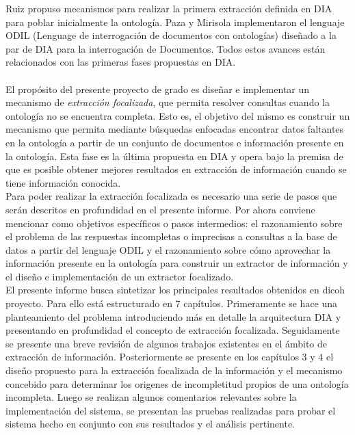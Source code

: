 Ruiz \cite{SemistructuredTextExtraction} \cite{ruiz-HMM} propuso mecanismos para realizar la primera extracción definida en DIA para poblar inicialmente la ontología. Paza y Mirisola \cite{ODILImplementation} implementaron el lenguaje ODIL (Lenguage de interrogación de documentos con ontologías) diseñado a la par de DIA para la interrogación de Documentos. Todos estos avances están relacionados con las primeras fases propuestas en DIA.  \\

\\


El propósito del presente proyecto de grado es diseñar e implementar un mecanismo de \emph{extracción focalizada}, que permita resolver consultas cuando la ontología no se encuentra completa. Esto es, el objetivo del mismo es construir un mecanismo que permita mediante búsquedas enfocadas encontrar datos faltantes en la ontología a partir de un conjunto de documentos e información presente en la ontología. Esta fase es la última propuesta en DIA y opera bajo la premisa de que es posible obtener mejores resultados en extracción de información cuando se tiene información conocida. \\

Para poder realizar la extracción focalizada es necesario una serie de pasos que serán descritos en profundidad en el presente informe. Por ahora conviene mencionar como objetivos específicos o pasos intermedios: el razonamiento sobre el problema de las respuestas incompletas o imprecisas a consultas a la base de datos a partir del lenguaje ODIL y el razonamiento sobre cómo aprovechar la información presente en la ontología para construir un extractor de información y el diseño e implementación de un extractor focalizado. \\


El presente informe busca sintetizar los principales resultados obtenidos en dicoh proyecto. Para ello está estructurado en 7 capítulos. Primeramente se hace una planteamiento del problema introduciendo más en detalle la arquitectura DIA y presentando en profundidad el concepto de extracción focalizada. Seguidamente se presente una breve revisión de algunos trabajos existentes en el ámbito de extracción de información. Posteriormente se presente en los capítulos 3 y 4 el diseño propuesto para la extracción focalizada de la información y el mecanismo concebido para determinar los origenes de incompletitud propios de una ontología incompleta. Luego se realizan algunos comentarios relevantes sobre la implementación del sistema, se presentan las pruebas realizadas para probar el sistema hecho en conjunto con sus resultados y el análisis pertinente. \\


